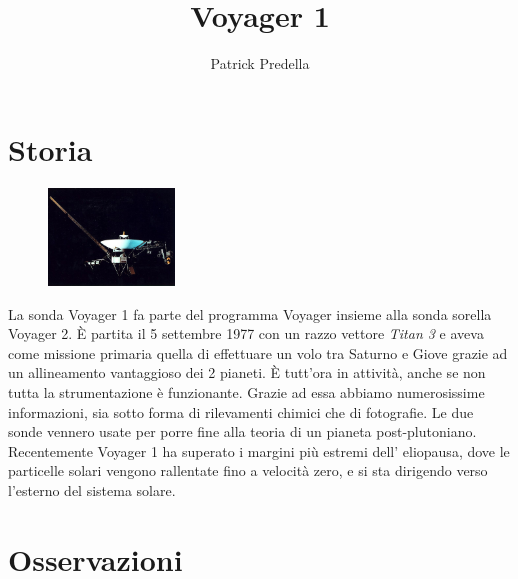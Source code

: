\documentclass[12pt,a4paper]{article}
\begin{document}
\title{\vspace{-70pt}Voyager 1}
\author{Patrick Predella}
\date{}
\maketitle
\pagestyle{empty}
\thispagestyle{empty}

\section*{Storia}
\label{storia}
\begin{figure}
  \vspace{-10pt}
  \begin{center}
    \includegraphics[width=0.30\textwidth]{satellite}
  \end{center}
  \vspace{-20pt}
\end{figure}
La sonda Voyager 1 fa parte del programma Voyager insieme alla sonda sorella Voyager 2. È partita il 5 settembre 1977 con un razzo vettore \emph{Titan 3} e aveva come missione primaria quella di effettuare un volo tra Saturno e Giove grazie ad un allineamento vantaggioso dei 2 pianeti. È tutt'ora in attività, anche se non tutta la strumentazione è funzionante.
Grazie ad essa abbiamo numerosissime informazioni, sia sotto forma di rilevamenti chimici che di fotografie. Le due sonde vennero usate per porre fine alla teoria di un pianeta post-plutoniano.
Recentemente Voyager 1 ha superato i margini più estremi dell' eliopausa, dove le particelle solari vengono rallentate fino a velocità zero, e si sta dirigendo verso l'esterno del sistema solare. 

\section*{Osservazioni}
\label{osservazioni}
\end{document}
